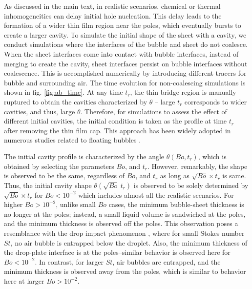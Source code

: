 \documentclass[reprint,amssymb,superscriptaddress,aps,prfluids,onecolumn]{revtex4-2}
\begin{document}
As discussed in the main text, in realistic scenarios, chemical or thermal inhomogeneities can delay initial hole nucleation. This delay leads to the formation of a wider thin film region near the poles, which eventually bursts to create a larger cavity. To simulate the initial shape of the sheet with a cavity, we conduct simulations where the interfaces of the bubble and sheet do not coalesce. When the sheet interfaces come into contact with bubble interfaces, instead of merging to create the cavity, sheet interfaces persist on bubble interfaces without coalescence. This is accomplished numerically by introducing different tracers for bubble and surrounding air. The time evolution for non-coalescing simulations is shown in fig. \ref{fig:ab_time}. At any time $t_r$, the thin bridge region is manually ruptured to obtain the cavities characterized by $\theta$ -- large $t_r$ corresponds to wider cavities, and thus, large $\theta$. Therefore, for simulations to assess the effect of different initial cavities, the initial condition is taken as the profile at time $t_r$ after removing the thin film cap. This approach has been widely adopted in numerous studies related to floating bubbles \cite{duchemin2002jet, deike2018dynamics}. 

The initial cavity profile is characterized by the angle $\theta (Bo, t_r)$, which is obtained by selecting the parameters $Bo$, and $t_r$. However, remarkably, the shape is observed to be the same, regardless of $Bo$, and $t_r$ as long as $\sqrt{Bo} \times t_r$ is same. Thus, the initial cavity shape $\theta(\sqrt{Bo} \ t_r)$ is observed to be solely determined by $\sqrt{Bo} \times t_r$ for $Bo < 10^{-2}$ which includes almost all the realistic scenarios. For higher $Bo > 10^{-2}$, unlike small $Bo$ cases, the minimum bubble-sheet thickness is no longer at the poles; instead, a small liquid volume is sandwiched at the poles, and the minimum thickness is observed off the poles. This observation poses a resemblance with the drop impact phenomenon \cite{bouwhuis2012maximal}, where for small Stokes number $St$, no air bubble is entrapped below the droplet. Also, the minimum thickness of the drop-plate interface is at the poles--similar behavior is observed here for $Bo < 10^{-2}$. In contrast, for larger $St$, air bubbles are entrapped, and the minimum thickness is observed away from the poles, which is similar to behavior here at larger $Bo > 10^{-2}$. 
\end{document}
